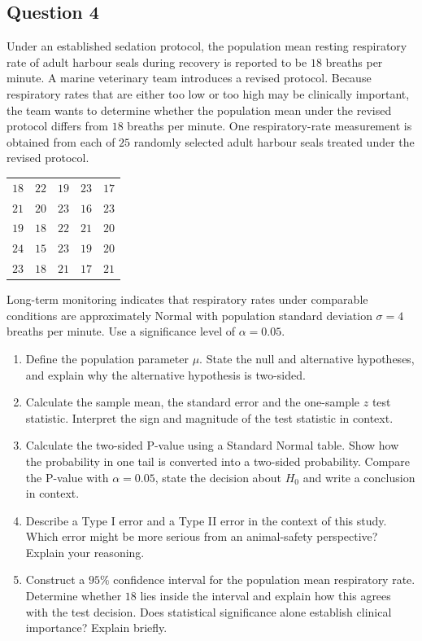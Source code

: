 \documentclass[10pt,letterpaper]{article}
\begin{document}
\subsection*{Question 4}
Under an established sedation protocol, the population mean resting respiratory rate of adult harbour seals during recovery is reported to be $18$ breaths per minute. A marine veterinary team introduces a revised protocol. Because respiratory rates that are either too low or too high may be clinically important, the team wants to determine whether the population mean under the revised protocol differs from $18$ breaths per minute. One respiratory-rate measurement is obtained from each of $25$ randomly selected adult harbour seals treated under the revised protocol.
\begin{center}
\begin{tabular}{rrrrr}
\toprule
$18$ & $22$ & $19$ & $23$ & $17$ \\
$21$ & $20$ & $23$ & $16$ & $23$ \\
$19$ & $18$ & $22$ & $21$ & $20$ \\
$24$ & $15$ & $23$ & $19$ & $20$ \\
$23$ & $18$ & $21$ & $17$ & $21$ \\
\bottomrule
\end{tabular}
\end{center}
Long-term monitoring indicates that respiratory rates under comparable conditions are approximately Normal with population standard deviation $\sigma=4$ breaths per minute. Use a significance level of $\alpha=0.05$.
\begin{enumerate}
	\item Define the population parameter $\mu$. State the null and alternative hypotheses, and explain why the alternative hypothesis is two-sided.
	\item Calculate the sample mean, the standard error and the one-sample $z$ test statistic. Interpret the sign and magnitude of the test statistic in context.
	\item Calculate the two-sided P-value using a Standard Normal table. Show how the probability in one tail is converted into a two-sided probability. Compare the P-value with $\alpha=0.05$, state the decision about $H_0$ and write a conclusion in context.
	\item Describe a Type I error and a Type II error in the context of this study. Which error might be more serious from an animal-safety perspective? Explain your reasoning.
	\item Construct a $95\%$ confidence interval for the population mean respiratory rate. Determine whether $18$ lies inside the interval and explain how this agrees with the test decision. Does statistical significance alone establish clinical importance? Explain briefly.
\end{enumerate}
\end{document}
